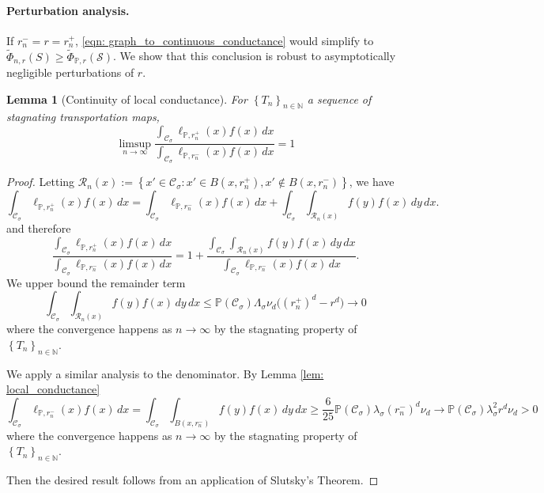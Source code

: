 \documentclass[11pt,twoside]{article}
\newtheorem{lemma}{Lemma}
\newcommand{\set}[1]{\left\{#1\right\}}
\newcommand{\seq}[1]{\left\{#1\right\}_{n \in \mathbb{N}}}
\newcommand{\1}{\mathbf{1}}
\newcommand{\Pbb}{\mathbb{P}}
\newcommand{\Sset}{\mathcal{S}}
\newcommand{\Cset}{\mathcal{C}}
\newcommand{\Csig}{\Cset_{\sigma}}
\newcommand{\dx}{\,dx}
\newcommand{\dy}{\,dy}
\begin{document}
\paragraph{Perturbation analysis.}

If $r_n^- = r = r_n^+$, \eqref{eqn: graph_to_continuous_conductance} would simplify to $\widetilde{\Phi}_{n,r}(S) \geq \widetilde{\Phi}_{\Pbb,r}(\Sset)$. We show that this conclusion is robust to asymptotically negligible perturbations of $r$.

\begin{lemma}[Continuity of local conductance]
	\label{lem: cont_local_conductance}
	For $\seq{T_n}$ a sequence of stagnating transportation maps,
	\begin{equation*}
	\limsup_{n \to \infty} \frac{\int_{\Csig} \ell_{\Pbb,r_n^+}(x) f(x) \dx}{\int_{\Csig} \ell_{\Pbb,r_n^-}(x) f(x) \dx} = 1
	\end{equation*}
\end{lemma}
\begin{proof}
	Letting $\mathcal{R}_n(x) := \set{x' \in \Csig: x' \in B(x,r_n^+), x' \not\in B(x,r_n^-)}$, we have
	\begin{equation*}
	\int_{\Csig} \ell_{\Pbb,r_n^+}(x) f(x) \dx = \int_{\Csig} \ell_{\Pbb,r_n^-}(x) f(x) \dx + \int_{\Csig} \int_{\mathcal{R}_n(x)} f(y) f(x) \dy \dx.
	\end{equation*}
	and therefore
	\begin{equation*}
	\frac{\int_{\Csig} \ell_{\Pbb,r_n^+}(x) f(x) \dx}{\int_{\Csig} \ell_{\Pbb,r_n^-}(x) f(x) \dx} = 1 + \frac{\int_{\Csig} \int_{\mathcal{R}_n(x)} f(y) f(x) \dy \dx}{\int_{\Csig} \ell_{\Pbb,r_n^-}(x) f(x) \dx}. 
	\end{equation*}
	We upper bound the remainder term
	\begin{equation*}
	\int_{\Csig} \int_{\mathcal{R}_n(x)} f(y) f(x) \dy \dx \leq \Pbb(\Csig) \Lambda_{\sigma} \nu_d \bigl((r_n^+)^d - r^d) \to 0
	\end{equation*}
	where the convergence happens as $n \to \infty$ by the stagnating property of $\seq{T_n}$. 
	
	We apply a similar analysis to the denominator. By Lemma \ref{lem: local_conductance}
	\begin{equation*}
	\int_{\Csig} \ell_{\Pbb,r_n^-}(x) f(x) \dx = \int_{\Csig} \int_{B(x,r_n^-)} f(y) f(x) \dy \dx \geq \frac{6}{25} \Pbb(\Csig) \lambda_{\sigma} (r_n^{-})^d \nu_d \to \Pbb(\Csig) \lambda_{\sigma}^2 r^d \nu_d > 0
	\end{equation*}
	where the convergence happens as $n \to \infty$ by the stagnating property of $\seq{T_n}$. 
	
	Then the desired result follows from an application of Slutsky's Theorem.
\end{proof}
\end{document}
